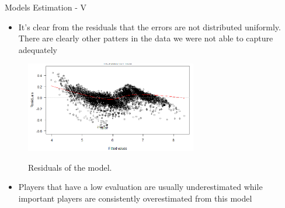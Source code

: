 \documentclass[aspectratio=169,xcolor=dvipsnames]{beamer}
\begin{document}

\begin{frame}{Models Estimation - V}
\begin{itemize}
\item It's clear from the residuals that the errors are not distributed uniformly. There are clearly other patters in the data we were not able to capture adequately
\end{itemize}

\begin{figure}[H] 
  \begin{center}
  \includegraphics[width=7.5cm]{residui_log_model1.png}\\ 
  \caption{Residuals of the model.}
  \end{center}
\end{figure}

\begin{itemize}
\item Players that have a low evaluation are usually underestimated while important players are consistently overestimated from this model
\end{itemize}
\end{frame}

\end{document}
